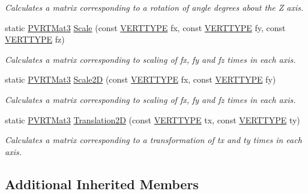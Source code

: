 \begin{DoxyCompactItemize}
\begin{DoxyCompactList}\small\item\em Calculates a matrix corresponding to a rotation of angle degrees about the Z axis. \end{DoxyCompactList}\item 
static \hyperlink{struct_p_v_r_t_mat3}{P\+V\+R\+T\+Mat3} \hyperlink{struct_p_v_r_t_mat3_a2f4d272d52205cbcf1e7ec742c76dae7}{Scale} (const \hyperlink{group___a_p_i___o_g_l_e_s_ga06da457b7d3e93368ab904f89e1396be}{V\+E\+R\+T\+T\+Y\+P\+E} fx, const \hyperlink{group___a_p_i___o_g_l_e_s_ga06da457b7d3e93368ab904f89e1396be}{V\+E\+R\+T\+T\+Y\+P\+E} fy, const \hyperlink{group___a_p_i___o_g_l_e_s_ga06da457b7d3e93368ab904f89e1396be}{V\+E\+R\+T\+T\+Y\+P\+E} fz)
\begin{DoxyCompactList}\small\item\em Calculates a matrix corresponding to scaling of fx, fy and fz times in each axis. \end{DoxyCompactList}\item 
static \hyperlink{struct_p_v_r_t_mat3}{P\+V\+R\+T\+Mat3} \hyperlink{struct_p_v_r_t_mat3_abc9cd2926eb303910f1ab45e2273c61c}{Scale2\+D} (const \hyperlink{group___a_p_i___o_g_l_e_s_ga06da457b7d3e93368ab904f89e1396be}{V\+E\+R\+T\+T\+Y\+P\+E} fx, const \hyperlink{group___a_p_i___o_g_l_e_s_ga06da457b7d3e93368ab904f89e1396be}{V\+E\+R\+T\+T\+Y\+P\+E} fy)
\begin{DoxyCompactList}\small\item\em Calculates a matrix corresponding to scaling of fx, fy and fz times in each axis. \end{DoxyCompactList}\item 
static \hyperlink{struct_p_v_r_t_mat3}{P\+V\+R\+T\+Mat3} \hyperlink{struct_p_v_r_t_mat3_a887692e58747c7cb0252db30657c0b1e}{Translation2\+D} (const \hyperlink{group___a_p_i___o_g_l_e_s_ga06da457b7d3e93368ab904f89e1396be}{V\+E\+R\+T\+T\+Y\+P\+E} tx, const \hyperlink{group___a_p_i___o_g_l_e_s_ga06da457b7d3e93368ab904f89e1396be}{V\+E\+R\+T\+T\+Y\+P\+E} ty)
\begin{DoxyCompactList}\small\item\em Calculates a matrix corresponding to a transformation of tx and ty times in each axis. \end{DoxyCompactList}\end{DoxyCompactItemize}
\subsection*{Additional Inherited Members}


